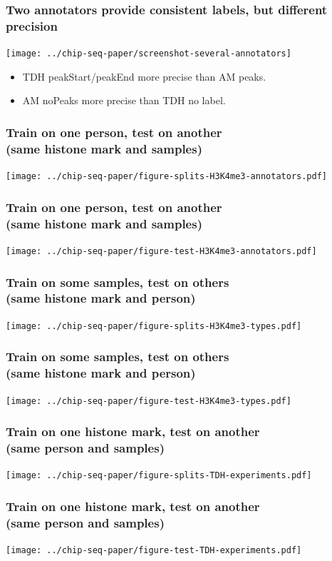\documentclass{beamer}
\begin{document}
\begin{frame}
  \frametitle{Two annotators provide consistent labels, but different
    precision}
  \texttt{[image: ../chip-seq-paper/screenshot-several-annotators]}

  \begin{itemize}
  \item TDH peakStart/peakEnd more precise than AM peaks.
  \item AM noPeaks more precise than TDH no label.
  \end{itemize}
\end{frame}

\begin{frame}
  \frametitle{Train on one person, test on another\\
(same histone mark and samples)}
  \texttt{[image: ../chip-seq-paper/figure-splits-H3K4me3-annotators.pdf]}
\end{frame}

\begin{frame}
  \frametitle{Train on one person, test on another\\
(same histone mark and samples)}
  \texttt{[image: ../chip-seq-paper/figure-test-H3K4me3-annotators.pdf]}
\end{frame}

\begin{frame}
  \frametitle{Train on some samples, test on others\\
(same histone mark and person)}
  \texttt{[image: ../chip-seq-paper/figure-splits-H3K4me3-types.pdf]}
\end{frame}

\begin{frame}
  \frametitle{Train on some samples, test on others\\
(same histone mark and person)}
  \texttt{[image: ../chip-seq-paper/figure-test-H3K4me3-types.pdf]}
\end{frame}

\begin{frame}
  \frametitle{Train on one histone mark, test on another\\
(same person and samples)}
  \texttt{[image: ../chip-seq-paper/figure-splits-TDH-experiments.pdf]}
\end{frame}

\begin{frame}
  \frametitle{Train on one histone mark, test on another\\
(same person and samples)}
  \texttt{[image: ../chip-seq-paper/figure-test-TDH-experiments.pdf]}
\end{frame}
\end{document}
